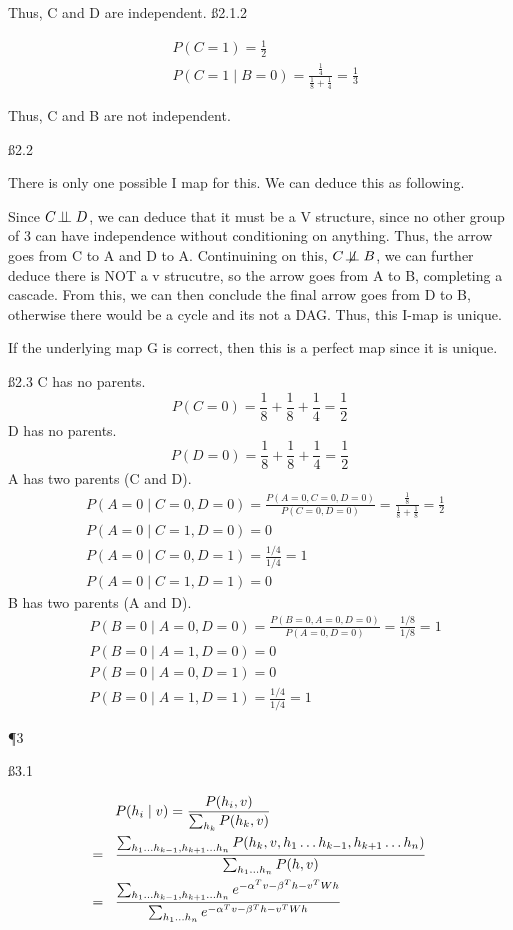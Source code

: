 Thus, C and D are independent.
\ss{2.1.2}

\begin{align*}
& P(C = 1) = \frac{1}{2} \\
& P(C = 1 \mid B = 0) = \frac{\frac{1}{4}}{\frac{1}{8} + \frac{1}{4}} = \frac{1}{3}
\end{align*}

Thus, C and B are not independent.

\ss{2.2}

There is only one possible I map for this. We can deduce this as following.

Since $C \!\perp\!\!\!\perp D$, we can deduce that it must be a V structure, since no other group of 3 can have independence without conditioning on anything. Thus, the arrow goes from C to A and D to A. Continuining on this, $C \not \!\perp\!\!\!\perp B$, we can further deduce there is NOT a v strucutre, so the arrow goes from A to B, completing a cascade. From this, we can then conclude the final arrow goes from D to B, otherwise there would be a cycle and its not a DAG. Thus, this I-map is unique.

If the underlying map G is correct, then this is a perfect map since it is unique.

\ss{2.3}
C has no parents. 
\[P(C=0) = \frac{1}{8} + \frac{1}{8} + \frac{1}{4} = \frac{1}{2}
\]
D has no parents. 
\[P(D=0) = \frac{1}{8} + \frac{1}{8} + \frac{1}{4} = \frac{1}{2}
\]
A has two parents (C and D). 
\begin{align*}
& P(A=0 \mid C=0 , D=0) = \frac{P(A=0, C=0, D=0)}{P(C=0, D=0)} = \frac{\frac{1}{8}}{\frac{1}{8} + \frac{1}{8}} = \frac{1}{2} \\
& P(A=0 \mid C=1 , D=0) = 0 \\
& P(A=0 \mid C=0 , D=1) = \frac{1/4}{1/4} = 1 \\
& P(A=0 \mid C=1 , D=1) = 0
\end{align*}
B has two parents (A and D). 
\begin{align*}
& P(B=0 \mid A=0 , D=0) = \frac{P(B=0, A=0, D=0)}{P(A=0, D=0)} = \frac{1/8}{1/8} = 1 \\
& P(B=0 \mid A=1 , D=0) = 0 \\
& P(B=0 \mid A=0 , D=1) = 0 \\
& P(B=0 \mid A=1 , D=1) = \frac{1/4}{1/4} = 1
\end{align*}

\P 3

\ss{3.1}

\begin{align*}
& P (h_i \mid v) = \frac {P (h_i, v)}{\sum_{h_k} P(h_k, v)} \\
= \hspace{3 mm}&\frac {\sum_{h_1 \dots h_{k-1}, h_{k+1} \dots h_n} P (h_k, v, h_1 \dots h_{k-1}, h_{k+1} \dots h_n)}{\sum_{h_1 \dots h_n} P(h, v)} \\
=  \hspace{3 mm} & \frac {\sum_{h_1 \dots h_{k-1}, h_{k+1} \dots h_n} e^{-\alpha^Tv-\beta^Th-v^TWh}}{\sum_{h_1 \dots h_n} e^{-\alpha^Tv-\beta^Th-v^TWh}}
\end{align*}

